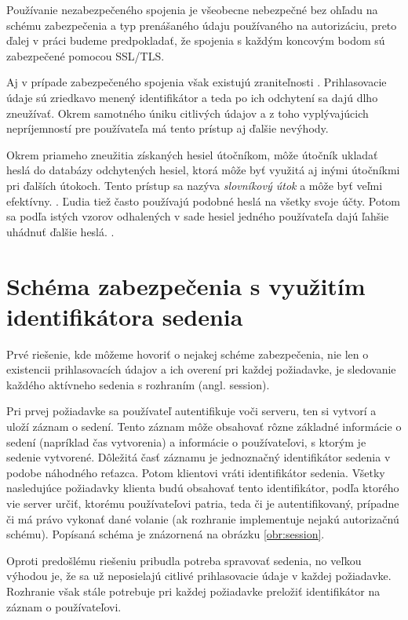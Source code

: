Používanie nezabezpečeného spojenia je všeobecne nebezpečné bez ohľadu na schému zabezpečenia a typ prenášaného údaju používaného na autorizáciu, preto ďalej v práci budeme predpokladať, že spojenia s každým koncovým bodom sú zabezpečené pomocou SSL/TLS.

Aj v prípade zabezpečeného spojenia však existujú zraniteľnosti \cite{tsl_vulnerabilities}. Prihlasovacie údaje sú zriedkavo menený identifikátor a teda po ich odchytení sa dajú dlho zneužívať. Okrem samotného úniku citlivých údajov a z toho vyplývajúcich nepríjemností pre používateľa má tento prístup aj ďalšie nevýhody.

Okrem priameho zneužitia získaných hesiel útočníkom, môže útočník ukladať heslá do databázy odchytených hesiel, ktorá môže byť využitá aj inými útočníkmi pri ďalších útokoch. Tento prístup sa nazýva \textit{slovníkový útok} a môže byť veľmi efektívny. \cite{fast_dict_attacks}. Ľudia tiež často používajú podobné heslá na všetky svoje účty. Potom sa podľa istých vzorov odhalených v sade hesiel jedného používateľa dajú ľahšie uhádnuť ďalšie heslá. \cite{password_patterns}.


\section{Schéma zabezpečenia s využitím identifikátora sedenia}
\label{sec:session}

Prvé riešenie, kde môžeme hovoriť o nejakej schéme zabezpečenia, nie len o existencii prihlasovacích údajov a ich overení pri každej požiadavke, je sledovanie každého aktívneho sedenia s rozhraním (angl. session).

Pri prvej požiadavke sa používateľ autentifikuje voči serveru, ten si vytvorí a uloží záznam o sedení. Tento záznam môže obsahovať rôzne základné informácie o sedení (napríklad čas vytvorenia) a informácie o používateľovi, s ktorým je sedenie vytvorené. Dôležitá časť záznamu je jednoznačný identifikátor sedenia v podobe náhodného reťazca. Potom klientovi vráti identifikátor sedenia. Všetky nasledujúce požiadavky klienta budú obsahovať tento identifikátor, podľa ktorého vie server určiť, ktorému používateľovi patria, teda či je autentifikovaný, prípadne či má právo vykonať dané volanie (ak rozhranie implementuje nejakú autorizačnú schému). Popísaná schéma je znázornená na obrázku \ref{obr:session}.

Oproti predošlému riešeniu pribudla potreba spravovať sedenia, no veľkou výhodou je, že sa už neposielajú citlivé prihlasovacie údaje v každej požiadavke. Rozhranie však stále potrebuje pri každej požiadavke preložiť identifikátor na záznam o používateľovi.


